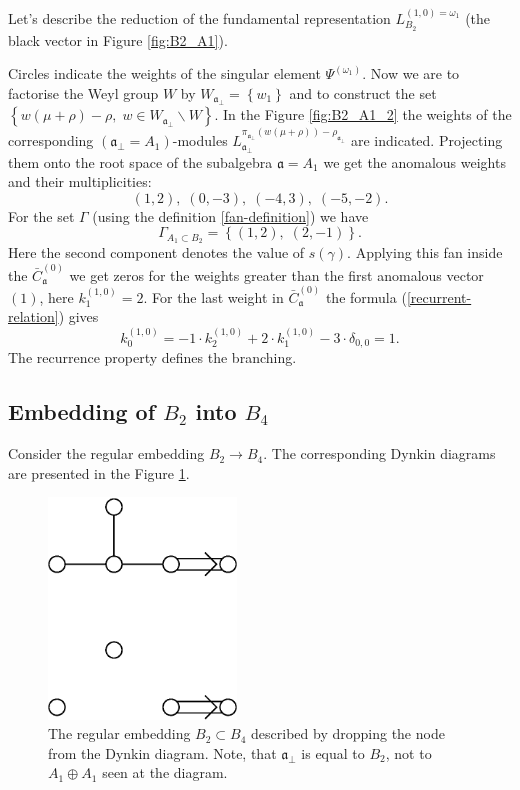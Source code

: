 \documentclass[12pt]{iopart}
\theoremstyle{definition}
\newcommand{\af}{\mathfrak{a}}
\newcommand{\afb}{\mathfrak{a}_{\bot}}
\begin{document}
Let's describe the reduction of the fundamental representation $L^{(1,0)=\omega_1}_{B_2}$ (the black vector in Figure \ref{fig:B2_A1}).

Circles indicate the weights of the singular element $\Psi^{(\omega_1)}$.
Now we are to factorise the Weyl group $W$ by $W_{\afb}=\left\{w_1\right\}$
and to construct the set $\left\{w(\mu+\rho)-\rho,\; w\in W_{\afb}\backslash W\right\}$.
In the Figure \ref{fig:B2_A1_2} the weights of the corresponding
$\left(\afb=A_1\right)$-modules
$L^{\pi_{\afb}(w(\mu+\rho))-\rho_{\afb}}_{\afb}$
are indicated. Projecting them onto the root space of the subalgebra $\af=A_1$
we get the anomalous weights and their multiplicities:
\begin{equation*}
  \label{eq:25}
  (1,2),\; (0,-3),\; (-4,3),\; (-5,-2).
\end{equation*}
For the set $\Gamma$ (using the definition \ref{fan-definition}) we have
\begin{equation*}
  \label{eq:22}
  \Gamma_{A_1\subset B_2}=\left\{ (1,2),\; (2,-1) \right\}.
\end{equation*}
Here the second component denotes the value of $s(\gamma)$.
Applying this fan inside the $\bar{C}^{(0)}_{\af}$ we get zeros for the weights
greater than the first anomalous vector $(1)$, here $k^{(1,0)}_1=2$. For the last weight in $\bar{C}^{(0)}_{\af}$ the formula (\ref{recurrent-relation}) gives
\begin{equation*}
  \label{eq:23}
  k^{(1,0)}_{0}=-1\cdot k^{(1,0)}_2 +2\cdot k^{(1,0)}_1 - 3\cdot \delta_{0,0} = 1.
\end{equation*}
The recurrence property defines the branching.

\subsection{Embedding of $B_2$ into $B_4$}
\label{sec:someth-high-dimens}
Consider the regular embedding $B_2 \longrightarrow B_4$.
The corresponding Dynkin diagrams are presented in the Figure \ref{fig:dynkin}.
\begin{figure}[h]
  \centering
  \includegraphics[width=50mm]{figure3.eps}
  \caption{The regular embedding $B_2\subset B_4$ described by dropping the node from the Dynkin diagram. Note, that $\afb$ is equal to $B_2$, not to $A_1\oplus A_1$ seen at the diagram.}
  \label{fig:dynkin}
\end{figure}
\end{document}

